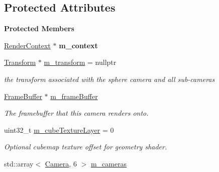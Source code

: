 \subsection*{Protected Attributes}
\begin{Indent}\textbf{ Protected Members}\par
\begin{DoxyCompactItemize}
\item 
\mbox{\label{classrev_1_1_point_light_camera_ac9fe67ff0300bfa3cbc6861813abcd49}} 
\mbox{\hyperlink{classrev_1_1_render_context}{Render\+Context}} $\ast$ {\bfseries m\+\_\+context}
\item 
\mbox{\hyperlink{classrev_1_1_transform}{Transform}} $\ast$ \mbox{\hyperlink{classrev_1_1_point_light_camera_a27b4f5ef37da48fb185f8afa2d1cd024}{m\+\_\+transform}} = nullptr
\begin{DoxyCompactList}\small\item\em the transform associated with the sphere camera and all sub-\/cameras \end{DoxyCompactList}\item 
\mbox{\label{classrev_1_1_point_light_camera_ab0f5b0147a2e874ef490c1290f33931b}} 
\mbox{\hyperlink{classrev_1_1_frame_buffer}{Frame\+Buffer}} $\ast$ \mbox{\hyperlink{classrev_1_1_point_light_camera_ab0f5b0147a2e874ef490c1290f33931b}{m\+\_\+frame\+Buffer}}
\begin{DoxyCompactList}\small\item\em The framebuffer that this camera renders onto. \end{DoxyCompactList}\item 
\mbox{\label{classrev_1_1_point_light_camera_a65d53152a59a5ce79855de2c00d853b8}} 
uint32\+\_\+t \mbox{\hyperlink{classrev_1_1_point_light_camera_a65d53152a59a5ce79855de2c00d853b8}{m\+\_\+cube\+Texture\+Layer}} = 0
\begin{DoxyCompactList}\small\item\em Optional cubemap texture offset for geometry shader. \end{DoxyCompactList}\item 
\mbox{\label{classrev_1_1_point_light_camera_ae69be18857cd1dd8ec50e515f9c003b0}} 
std\+::array$<$ \mbox{\hyperlink{classrev_1_1_camera}{Camera}}, 6 $>$ \mbox{\hyperlink{classrev_1_1_point_light_camera_ae69be18857cd1dd8ec50e515f9c003b0}{m\+\_\+cameras}}

\end{DoxyCompactItemize}
\end{Indent}
